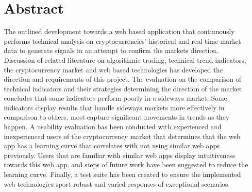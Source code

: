 %

%
\chapter*{Abstract}
\label{sec:abstract}
\thispagestyle{empty}

The outlined development towards a web based application that continuously performs technical analysis on cryptocurrencies' historical and real time market data to generate signals in an attempt to confirm the markets direction. Discussion of related literature on algorithmic trading, technical trend indicators, the cryptocurrency market and web based technologies has developed the direction and requirements of this project. The evaluation on the comparison of technical indicators and their strategies determining the direction of the market concludes that some indicators perform poorly in a sideways market. Some indicators display results that handle sideways markets more effectively in comparison to others, most capture significant movements in trends as they happen. A usability evaluation has been conducted with experienced and inexperienced users of the cryptocurrency market that determines that the web app has a learning curve that correlates with not using similar web apps previously. Users that are familiar with similar web apps display intuitiveness towards this web app, and steps of future work have been suggested to reduce the learning curve. Finally, a test suite has been created to ensure the implemented web technologies sport robust and varied responses of exceptional scenarios.

\newpage





